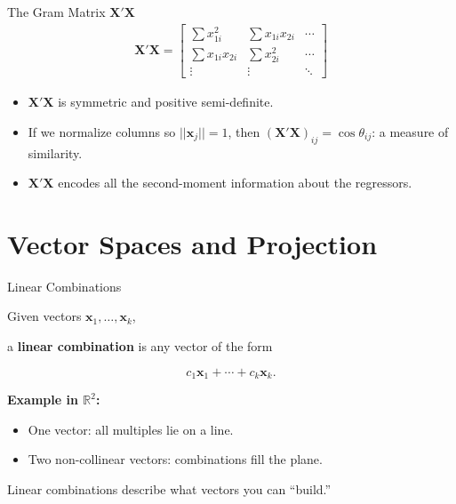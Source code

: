 \documentclass[aspectratio=169, handout, t]{beamer}
\numberwithin{equation}{section}
\begin{document}
\begin{frame}{The Gram Matrix $\bm{X}'\bm{X}$}
\begin{align*}
\bm{X}'\bm{X}  = \begin{bmatrix} \sum x_{1i}^2 & \sum x_{1i}x_{2i}& \cdots\\
\sum x_{1i}x_{2i}& \sum x_{2i}^2  & \cdots\\
\vdots & \vdots & \ddots
  \end{bmatrix}
  \end{align*}
\begin{itemize}
  \item $\bm{X}'\bm{X}$ is symmetric and positive semi-definite.\pause
  \item If we normalize columns so $||\bm{x}_j||=1$, then $(\bm{X}'\bm{X})_{ij}=\cos\theta_{ij}$: a measure of similarity.\pause
  \item $\bm{X}'\bm{X}$ encodes all the second-moment information about the regressors.
\end{itemize}
\end{frame}

\section[Projection]{Vector Spaces and Projection}
\begin{frame}{Linear Combinations}

Given vectors $\bm{x}_1, \ldots, \bm{x}_k$,

a \textbf{linear combination} is any vector of the form

\[
c_1 \bm{x}_1 + \cdots + c_k \bm{x}_k.
\]

\vspace{0.4cm}

\textbf{Example in $\mathbb{R}^2$:}

\begin{itemize}
    \item One vector: all multiples lie on a line.\pause
    \item Two non-collinear vectors: combinations fill the plane.
\end{itemize}

\vspace{0.4cm}

Linear combinations describe what vectors you can ``build.''

\end{frame}
\end{document}
